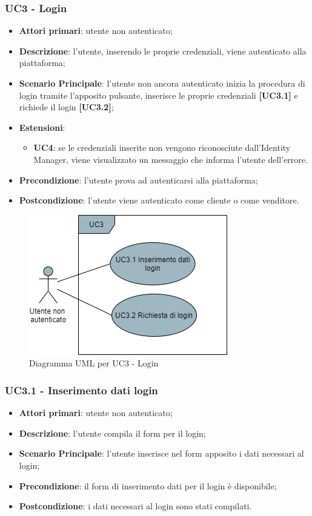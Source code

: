 \subsubsection{UC3 - Login}
\begin{itemize}
\item \textbf{Attori primari}: utente non autenticato;
\item \textbf{Descrizione}: l'utente, inserendo le proprie credenziali, viene autenticato alla piattaforma;
\item \textbf{Scenario Principale}: l'utente non ancora autenticato inizia la procedura di login tramite l'apposito pulsante, inserisce le proprie credenziali \textbf{[UC3.1]} e richiede il login \textbf{[UC3.2]};
\item \textbf{Estensioni}:
\begin{itemize}
	\item \textbf{UC4}: se le credenziali inserite non vengono riconosciute dall'Identity Manager, viene visualizzato un messaggio che informa l'utente dell'errore.
\end{itemize}
\item \textbf{Precondizione}: l'utente prova ad autenticarsi alla piattaforma;
\item \textbf{Postcondizione}: l'utente viene autenticato come cliente o come venditore.
\end{itemize}

\begin{figure}[H]
\centering
\includegraphics[scale=0.6]{res/UseCase/Immagini/LoginSottocasi}
\caption{Diagramma UML per UC3 - Login}
\end{figure}

\subsubsection{UC3.1 - Inserimento dati login}
\begin{itemize}
\item \textbf{Attori primari}: utente non autenticato;
\item \textbf{Descrizione}: l'utente compila il form per il login;
\item \textbf{Scenario Principale}: l'utente inserisce nel form apposito i dati necessari al login;
\item \textbf{Precondizione}: il form di inserimento dati per il login è disponibile;
\item \textbf{Postcondizione}: i dati necessari al login sono stati compilati.
\end{itemize}

